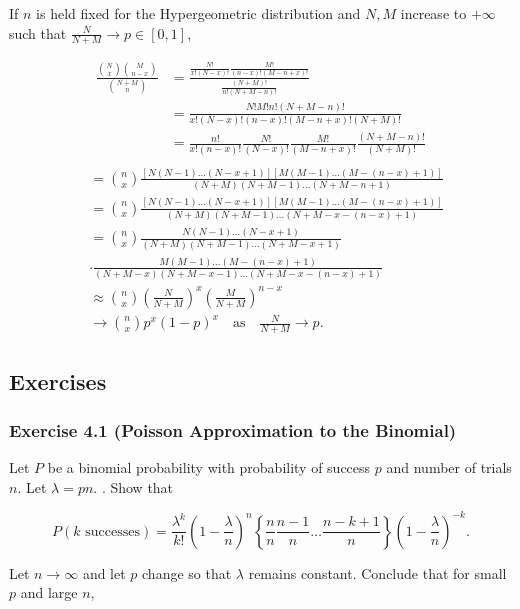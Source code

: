 \documentclass{article}
\begin{document}
{If $n$ is held fixed for the Hypergeometric distribution and $N,M$ increase to $+\infty$ such that $\frac{N}{N+M} \rightarrow p \in [0,1]$,

\begin{align*}
\frac{\binom{N}{x}\binom{M}{n-x}}{\binom{N+M}{n}}
&= \frac{\frac{N!}{x!(N-x)!}\frac{M!}{(n-x)!(M-n+x)!}}{\frac{(N+M)!}{n!(N+M-n)!}} \\
&=\frac{N!M!n!(N+M-n)!}{x!(N-x)!(n-x)!(M-n+x)!(N+M)!} \\
&= \frac{n!}{x!(n-x)!}\frac{N!}{(N-x)!}\frac{M!}{(M-n+x)!} \frac{(N+M -n)!}{(N+M)!} \\
\end{align*}
\begin{align*}
&= \binom{n}{x} \frac{[N(N-1)\dots (N-x+1)][M(M-1)\dots (M-(n-x) + 1)]}{(N+M)(N+M-1)\dots (N+M - n + 1)} \\
&= \binom{n}{x} \frac{[N(N-1)\dots (N-x+1)][M(M-1)\dots (M-(n-x) + 1)]}{(N+M)(N+M-1)\dots (N+M - x - (n-x) + 1)} \\
&= \binom{n}{x} \frac{N(N-1)\dots (N-x+1)}{(N+M)(N+M-1)\dots (N+M - x + 1)} \\
&\cdot \frac{M(M-1)\dots (M-(n-x) + 1)}{(N+M-x)(N+M-x-1)\dots (N+M - x - (n-x) + 1)}\\
& \approx \binom{n}{x}\left(\frac{N}{N+M}\right)^x \left(\frac{M}{N+M}\right)^{n-x} \\
&\rightarrow \binom{n}{x}p^x(1-p)^x \quad \text{as} \quad  \frac{N}{N+M} \rightarrow p.
\end{align*}

\subsection*{Exercises}

\subsubsection*{Exercise 4.1 (Poisson Approximation to the Binomial)}

Let $P$ be a binomial probability with probability of success $p$ and number of trials $n$. Let $\lambda = pn$. . Show that

$$
P(k \text{ successes}) = \frac{\lambda^k}{k!}(1-\frac{\lambda}{n})^n \left\lbrace\frac{n}{n}\frac{n-1}{n} \dots \frac{n-k+1}{n}\right\rbrace (1 - \frac{\lambda}{n})^{-k}.
$$

Let $n \rightarrow \infty$ and let $p$ change so that $\lambda$ remains constant. Conclude that for
small $p$ and large $n$,

}
\end{document}
